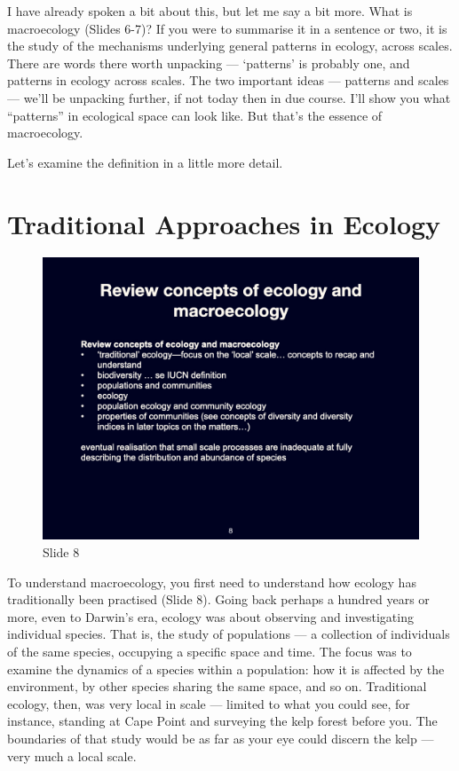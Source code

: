 \documentclass[
  10pt,
]{book}
\begin{document}
I have already spoken a bit about this, but let me say a bit more. What
is macroecology (Slides 6-7)? If you were to summarise it in a sentence
or two, it is the study of the mechanisms underlying general patterns in
ecology, across scales. There are words there worth unpacking ---
`patterns' is probably one, and patterns in ecology across scales. The
two important ideas --- patterns and scales --- we'll be unpacking
further, if not today then in due course. I'll show you what
``patterns'' in ecological space can look like. But that's the essence
of macroecology.

Let's examine the definition in a little more detail.

\section{Traditional Approaches in
Ecology}\label{traditional-approaches-in-ecology}

\begin{figure}[ht]
\centering
\includegraphics[width=0.8\linewidth]{../images/BDC334/BDC334-008.jpeg}
\caption*{Slide 8}
\end{figure}

To understand macroecology, you first need to understand how ecology has
traditionally been practised (Slide 8). Going back perhaps a hundred
years or more, even to Darwin's era, ecology was about observing and
investigating individual species. That is, the study of populations ---
a collection of individuals of the same species, occupying a specific
space and time. The focus was to examine the dynamics of a species
within a population: how it is affected by the environment, by other
species sharing the same space, and so on. Traditional ecology, then,
was very local in scale --- limited to what you could see, for instance,
standing at Cape Point and surveying the kelp forest before you. The
boundaries of that study would be as far as your eye could discern the
kelp --- very much a local scale.
\end{document}

